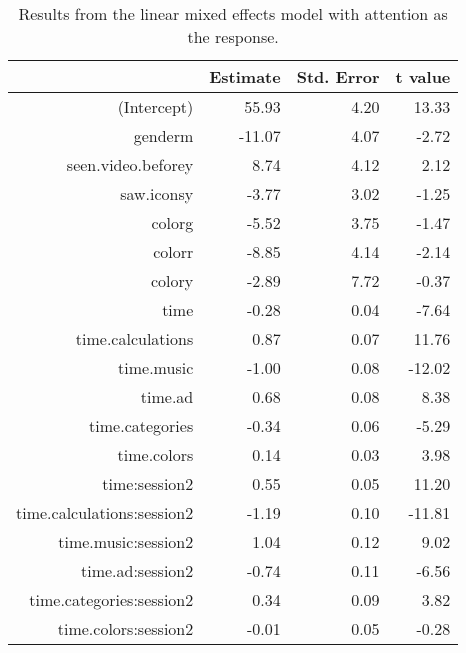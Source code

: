 \begin{table}[ht]
\centering
\begin{tabular}{rrrr}
  \hline
 & Estimate & Std. Error & t value \\ 
  \hline
(Intercept) & 55.93 & 4.20 & 13.33 \\ 
  genderm & -11.07 & 4.07 & -2.72 \\ 
  seen.video.beforey & 8.74 & 4.12 & 2.12 \\ 
  saw.iconsy & -3.77 & 3.02 & -1.25 \\ 
  colorg & -5.52 & 3.75 & -1.47 \\ 
  colorr & -8.85 & 4.14 & -2.14 \\ 
  colory & -2.89 & 7.72 & -0.37 \\ 
  time & -0.28 & 0.04 & -7.64 \\ 
  time.calculations & 0.87 & 0.07 & 11.76 \\ 
  time.music & -1.00 & 0.08 & -12.02 \\ 
  time.ad & 0.68 & 0.08 & 8.38 \\ 
  time.categories & -0.34 & 0.06 & -5.29 \\ 
  time.colors & 0.14 & 0.03 & 3.98 \\ 
  time:session2 & 0.55 & 0.05 & 11.20 \\ 
  time.calculations:session2 & -1.19 & 0.10 & -11.81 \\ 
  time.music:session2 & 1.04 & 0.12 & 9.02 \\ 
  time.ad:session2 & -0.74 & 0.11 & -6.56 \\ 
  time.categories:session2 & 0.34 & 0.09 & 3.82 \\ 
  time.colors:session2 & -0.01 & 0.05 & -0.28 \\ 
   \hline
\end{tabular}
\caption{Results from the linear mixed effects model
             with attention as the response.} 
\label{tab:att}
\end{table}
